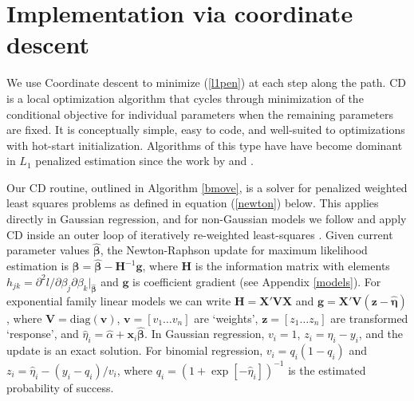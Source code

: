 \documentclass[12pt]{article}
\newcommand{\bs}[1]{\boldsymbol{#1}}
\newcommand{\mr}[1]{\mathrm{#1}}
\newcommand{\bm}[1]{\mathbf{#1}}
\begin{document}
\section{Implementation via coordinate descent}
\label{implement}

We use Coordinate descent \citep[CD; e.g.,][]{luenberger_linear_2008} to minimize
(\ref{l1pen}) at each step along the path. CD is a local optimization
algorithm that cycles through minimization of the conditional objective for
individual parameters when the remaining parameters are fixed.  It is
conceptually simple, easy to code, and well-suited to optimizations with
hot-start initialization. Algorithms of this type have have become dominant in
$L_1$ penalized estimation since the work by \citet{friedman_pathwise_2007} and
\citet{wu_coordinate_2008}.

Our CD routine, outlined in Algorithm \ref{bmove}, is a solver for penalized
weighted least squares problems as defined in equation (\ref{newton}) below.
This applies directly in Gaussian regression, and for non-Gaussian models  we
follow \citet{friedman_regularization_2010} and apply CD inside an outer loop
of iteratively re-weighted least-squares \citep[IRLS;
e.g.,][]{green_iteratively_1984}. Given current parameter values
$\bs{\hat\beta}$, the Newton-Raphson update for maximum likelihood estimation
is $\bs{\beta} = \bs{\hat\beta} - \bm{H}^{-1}\bm{g}$, where $\bm{H}$ is the
information matrix with elements $h_{jk} = \partial^2 l/\partial
\beta_j\partial \beta_k |_{\bs{\hat\beta}}$ and $\bm{g}$ is coefficient
gradient (see Appendix \ref{models}). For exponential family linear models we
can write $\bm{H} = \bm{X}'\bm{V}\bm{X}$ and $\bm{g} = \bm{X}'\bm{V}(\bm{z} -
\bs{\hat\eta})$, where $\bm{V} = \mr{diag}(\bm{v})$, $\bm{v} = [v_1\ldots
v_n]$ are `weights', $\bm{z} = [z_1\ldots z_n]$ are transformed `response',
and $\hat\eta_i = \hat\alpha + \bm{x}_i\bs{\hat\beta}$.  In Gaussian
regression,  $v_i = 1$, $z_i=\hat\eta_i - y_i$, and the update is an exact
solution. For binomial regression, $v_i = q_i(1-q_i)$ and $z_i = \hat\eta_i -
(y_i-q_i)/v_i$, where $q_i = (1 + \exp[-\hat\eta_i])^{-1}$ is the  estimated
probability of success.
\end{document}
